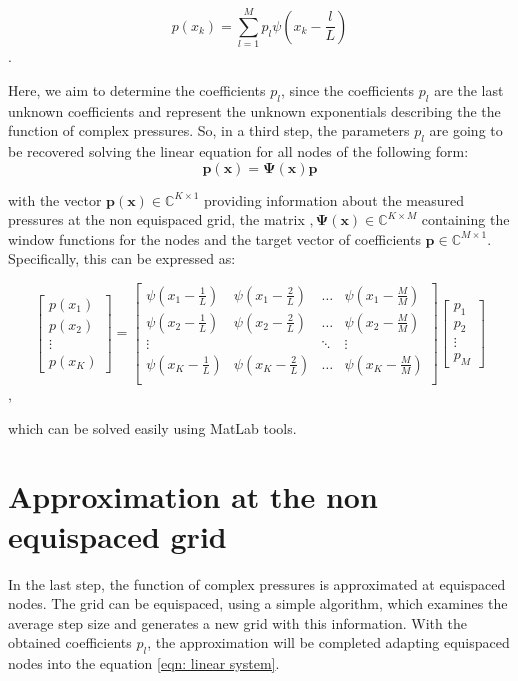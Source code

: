 \documentclass[11pt]{report} %
\begin{document}
\begin{equation}
p(x_{k})=\sum\limits_{l=1}^M p_{l}\psi(x_{k}-\frac{l}{L})\label{eqn: linear system}
\end{equation}.

Here, we aim to determine the coefficients $p_l$, since the coefficients $p_l$ are the last unknown coefficients and represent the unknown exponentials describing the the function of complex pressures.
So, in a third step, the parameters $p_l$ are going to be recovered solving the linear equation for all nodes of the following form: 
\begin{equation}
\bm{p(x)} = \bm{\Psi (x)} \bm{p}
\end{equation}

with the  vector $\bm{p(x)} \in \mathbb{C}^{K \times 1}$ providing information about the measured pressures at the non equispaced grid, the matrix $,\bm{\Psi (x)} \in \mathbb{C}^{K \times M}$ containing the window functions for the nodes  and the target vector of coefficients $\bm{p} \in \mathbb{C}^{M \times 1}$.
Specifically, this can be expressed as: 

\[
\begin{bmatrix}
	p(x_1) \\
	p(x_2) \\
	\vdots\\
	p(x_K)
\end{bmatrix} = 
\begin{bmatrix}
    \psi(x_{1}-\frac{1}{L})& \psi(x_{1}-\frac{2}{L})& \dots & \psi(x_{1}-\frac{M}{M}) \\
    \psi(x_{2}-\frac{1}{L})& \psi(x_{2}-\frac{2}{L})& \dots & \psi(x_{2}-\frac{M}{M}) \\
    \vdots &  &\ddots & \vdots \\
    \psi(x_{K}-\frac{1}{L})& \psi(x_{K}-\frac{2}{L})& \dots & \psi(x_{K}-\frac{M}{M}) \\   
\end{bmatrix}
\begin{bmatrix}
    p_1 \\
    p_2 \\
    \vdots \\
    p_{M}
\end{bmatrix}
\],

which can be solved easily using MatLab tools.

\section{Approximation at the non equispaced grid}
In the last step, the function of complex pressures is approximated at equispaced nodes. The grid can be equispaced, using a simple algorithm, which examines the average step size and generates a new grid with this information.
With the obtained coefficients $p_l$, the approximation will be completed adapting equispaced nodes into the equation \eqref{eqn: linear system}. 
\end{document}
